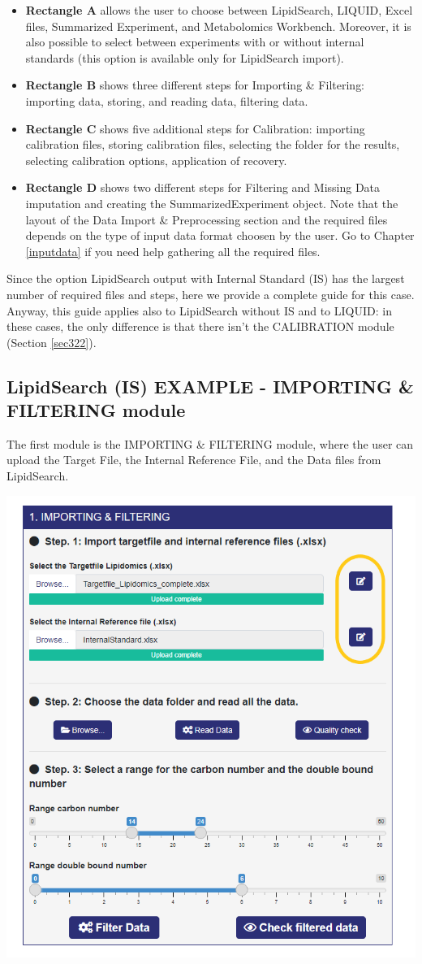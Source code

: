 \documentclass[
]{book}
\providecommand{\tightlist}{%
  \setlength{\itemsep}{0pt}\setlength{\parskip}{0pt}}
\begin{document}
\begin{itemize}
\tightlist
\item
  \textbf{Rectangle A} allows the user to choose between LipidSearch, LIQUID, Excel files, Summarized Experiment, and Metabolomics Workbench. Moreover, it is also possible to select between experiments with or without internal standards (this option is available only for LipidSearch import).
\item
  \textbf{Rectangle B} shows three different steps for Importing \& Filtering: importing data, storing, and reading data, filtering data.
\item
  \textbf{Rectangle C} shows five additional steps for Calibration: importing calibration files, storing calibration files, selecting the folder for the results, selecting calibration options, application of recovery.
\item
  \textbf{Rectangle D} shows two different steps for Filtering and Missing Data imputation and creating the SummarizedExperiment object. Note that the layout of the Data Import \& Preprocessing section and the required files depends on the type of input data format choosen by the user. Go to Chapter \ref{inputdata} if you need help gathering all the required files.
\end{itemize}

Since the option LipidSearch output with Internal Standard (IS) has the largest number of required files and steps, here we provide a complete guide for this case. Anyway, this guide applies also to LipidSearch without IS and to LIQUID: in these cases, the only difference is that there isn't the CALIBRATION module (Section \ref{sec322}).

\hypertarget{sec321}{%
\subsection{LipidSearch (IS) EXAMPLE - IMPORTING \& FILTERING module}\label{sec321}}

The first module is the IMPORTING \& FILTERING module, where the user can upload the Target File, the Internal Reference File, and the Data files from LipidSearch.

\begin{center}\includegraphics[width=0.6\linewidth]{images/input_step} \end{center}
\end{document}
